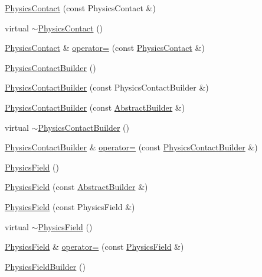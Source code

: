 \begin{DoxyCompactItemize}
\item 
\hyperlink{namespacejli_a6c69c031c6a878af0fd0c049d6373d72}{Physics\+Contact} (const Physics\+Contact \&)
\item 
virtual \hyperlink{namespacejli_a8c00d7a02e65a5f0bbb102633d1ec822}{$\sim$\+Physics\+Contact} ()
\item 
\hyperlink{namespacejli_a87bec69a241d3a7d72c6a92035e457d7}{Physics\+Contact} \& \hyperlink{namespacejli_a954927e0e64c45ab4101c5f1a225bc8b}{operator=} (const \hyperlink{namespacejli_a87bec69a241d3a7d72c6a92035e457d7}{Physics\+Contact} \&)
\item 
\hyperlink{namespacejli_aea643af7d1f6e26fbfe89083f21af41e}{Physics\+Contact\+Builder} ()
\item 
\hyperlink{namespacejli_a1ba1e346098dfdff4672e3751cc5af01}{Physics\+Contact\+Builder} (const Physics\+Contact\+Builder \&)
\item 
\hyperlink{namespacejli_aa47f3bd4a0fff03f0bfed6cb895496a5}{Physics\+Contact\+Builder} (const \hyperlink{classjli_1_1_abstract_builder}{Abstract\+Builder} \&)
\item 
virtual \hyperlink{namespacejli_aa54009c7e43166072a32826d3baa4975}{$\sim$\+Physics\+Contact\+Builder} ()
\item 
\hyperlink{namespacejli_aea643af7d1f6e26fbfe89083f21af41e}{Physics\+Contact\+Builder} \& \hyperlink{namespacejli_af5f2d415ac3003221faf09452f3e0e52}{operator=} (const \hyperlink{namespacejli_aea643af7d1f6e26fbfe89083f21af41e}{Physics\+Contact\+Builder} \&)
\item 
\hyperlink{namespacejli_a0a08739050a9f0d65a42f52165e144da}{Physics\+Field} ()
\item 
\hyperlink{namespacejli_a7de2a9a810c6e0c8ae0cf9f9b5e45dd2}{Physics\+Field} (const \hyperlink{classjli_1_1_abstract_builder}{Abstract\+Builder} \&)
\item 
\hyperlink{namespacejli_a81ad65e3c5a7904b33ac3905d1ad36a1}{Physics\+Field} (const Physics\+Field \&)
\item 
virtual \hyperlink{namespacejli_aec2c4f308d34637940e5e64cdc8c0f86}{$\sim$\+Physics\+Field} ()
\item 
\hyperlink{namespacejli_a0a08739050a9f0d65a42f52165e144da}{Physics\+Field} \& \hyperlink{namespacejli_a128ad3fb294f27690b42d3bdb3d467cd}{operator=} (const \hyperlink{namespacejli_a0a08739050a9f0d65a42f52165e144da}{Physics\+Field} \&)
\item 
\hyperlink{namespacejli_a3993b3872eea01dec1c9bd07bb35aae8}{Physics\+Field\+Builder} ()
\item 

\end{DoxyCompactItemize}
